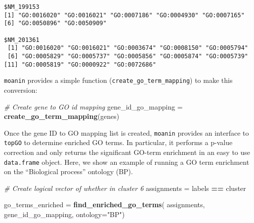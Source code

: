 \documentclass[9pt,a4paper,]{extarticle}
\newenvironment{Shaded}{\begin{snugshade}}{\end{snugshade}}
\newcommand{\CommentTok}[1]{\textcolor[rgb]{0.56,0.35,0.01}{\textit{#1}}}
\newcommand{\DataTypeTok}[1]{\textcolor[rgb]{0.13,0.29,0.53}{#1}}
\newcommand{\KeywordTok}[1]{\textcolor[rgb]{0.13,0.29,0.53}{\textbf{#1}}}
\newcommand{\NormalTok}[1]{#1}
\newcommand{\OperatorTok}[1]{\textcolor[rgb]{0.81,0.36,0.00}{\textbf{#1}}}
\newcommand{\StringTok}[1]{\textcolor[rgb]{0.31,0.60,0.02}{#1}}
\begin{document}
\begin{verbatim}
$NM_199153
[1] "GO:0016020" "GO:0016021" "GO:0007186" "GO:0004930" "GO:0007165"
[6] "GO:0050896" "GO:0050909"

$NM_201361
 [1] "GO:0016020" "GO:0016021" "GO:0003674" "GO:0008150" "GO:0005794"
 [6] "GO:0005829" "GO:0005737" "GO:0005856" "GO:0005874" "GO:0005739"
[11] "GO:0005819" "GO:0000922" "GO:0072686"
\end{verbatim}

\texttt{moanin} provides a simple function (\texttt{create\_go\_term\_mapping}) to make this conversion:

\begin{Shaded}
\begin{Highlighting}[]
\CommentTok{# Create gene to GO id mapping}
\NormalTok{gene_id_go_mapping =}\StringTok{ }\KeywordTok{create_go_term_mapping}\NormalTok{(genes)}
\end{Highlighting}
\end{Shaded}

Once the gene ID to GO mapping list is created, \texttt{moanin} provides an interface
to \texttt{topGO} to determine enriched GO terms. In particular, it performs a
p-value correction and only returns the significant GO-term enrichment in an
easy to use \texttt{data.frame} object. Here, we show an example of running a GO term
enrichment on the ``Biological process'' ontology (BP).

\begin{Shaded}
\begin{Highlighting}[]
\CommentTok{# Create logical vector of whether in cluster 6}
\NormalTok{assignments =}\StringTok{ }\NormalTok{labels }\OperatorTok{==}\StringTok{ }\NormalTok{cluster}

\NormalTok{go_terms_enriched =}\StringTok{ }\KeywordTok{find_enriched_go_terms}\NormalTok{(}
\NormalTok{    assignments,}
\NormalTok{    gene_id_go_mapping, }\DataTypeTok{ontology=}\StringTok{"BP"}\NormalTok{)}
\end{Highlighting}
\end{Shaded}
\end{document}
